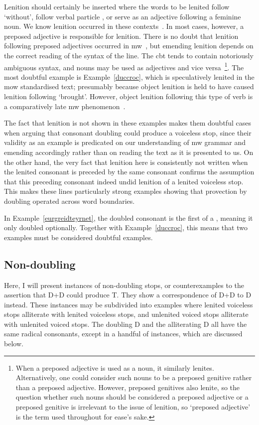 Lenition should certainly be inserted where the words to be lenited follow  `without', follow verbal particle , or serve as an adjective following a feminine noun. We know lenition occurred in these contexts~\parencite[\S\S 20, 22, 23]{evans_grammar_1964}. 
In most cases, however, a preposed adjective is responsible for lenition. There is no doubt that lenition following preposed adjectives occurred in \gls{mw}~\parencite[\S 20]{evans_grammar_1964}, but emending lenition depends on the correct reading of the syntax of the line. The \gls{cbt} tends to contain notoriously ambiguous syntax, and nouns may be used as adjectives and vice versa~\parencite{daniel_cyfuniadau_2003}\footnote{When a preposed adjective is used as a noun, it similarly lenites. Alternatively, one could consider such nouns to be a preposed genitive rather than a preposed adjective. However, preposed genitives also lenite, so the question whether such nouns should be considered a preposed adjective or a preposed genitive is irrelevant to the issue of lenition, so `preposed adjective' is the term used throughout for ease's sake.}. 
The most doubtful example is Example~\ref{duccroc}, which is speculatively lenited in the \gls{mow} standardised text; presumably because object lenition is held to have caused lenition following  `brought'. However, object lenition following this type of verb is a comparatively late \gls{mw} phenomenon~\parencite[55-57]{van_sluis_development_2014}. 

The fact that lenition is not shown in these examples makes them doubtful cases when arguing that consonant doubling could produce a voiceless stop, since their validity as an example is predicated on our understanding of \gls{mw} grammar and emending accordingly rather than on reading the text as it is presented to us. On the other hand, the very fact that lenition here is consistently not written when the lenited consonant is preceded by the same consonant confirms the assumption that this preceding consonant indeed undid  lenition of a lenited voiceless stop. This makes these lines particularly strong examples showing that provection by doubling operated across word boundaries.

In Example~\ref{eurgreidteyrnet}, the doubled consonant is the first of a , meaning it only doubled optionally. Together with Example~\ref{duccroc}, this means that two examples must be considered doubtful examples.

\subsection{Non-doubling}
Here, I will present instances of non-doubling stops, or counterexamples to the assertion that \gls{D}+\gls{D} could produce \gls{T}. They show a correspondence of \gls{D}+\gls{D} to \gls{D} instead. These instances may be subdivided into examples where lenited voiceless stops alliterate with lenited voiceless stops, and unlenited voiced stops alliterate with unlenited voiced stops. The doubling \gls{D} and the alliterating \gls{D} all have the same radical consonants, except in a handful of instances, which are discussed below.


